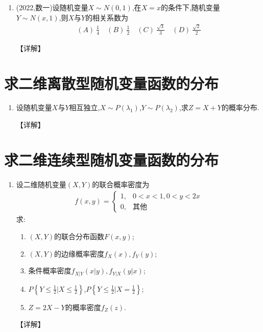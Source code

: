\documentclass[12pt, a4paper, oneside, UTF8]{ctexbook}
\begin{document}
\begin{enumerate}[label=\arabic*.,start=4]
    \item (2022,数一)设随机变量$X\sim N(0,1)$,在$X=x$的条件下,随机变量$Y\sim N(x,1)$,则$X$与$Y$的相关系数为
    \begin{align*}
        (A)\ \frac{1}{4} \quad (B)\ \frac{1}{2} \quad (C)\ \frac{\sqrt{3}}{3} \quad (D)\ \frac{\sqrt{2}}{2}
    \end{align*}
    
    \begin{solution}
    【详解】
    \end{solution}
\end{enumerate}

\section{求二维离散型随机变量函数的分布}

\begin{enumerate}[label=\arabic*.,start=12]
    \item 设随机变量$X$与$Y$相互独立,$X\sim P(\lambda_1)$,$Y\sim P(\lambda_2)$,求$Z=X+Y$的概率分布.
    
    \begin{solution}
    【详解】
    \end{solution}
\end{enumerate}

\section{求二维连续型随机变量函数的分布}

\begin{enumerate}[label=\arabic*.,start=13]
    \item 设二维随机变量$(X,Y)$的联合概率密度为
    \begin{align*}
        f(x,y)=\begin{cases}
            1, & 0<x<1,0<y<2x \\
            0, & \text{其他}
        \end{cases}
    \end{align*}
    求:
    \begin{enumerate}
        \item $(X,Y)$的联合分布函数$F(x,y)$;
        \item $(X,Y)$的边缘概率密度$f_X(x),f_Y(y)$;
        \item 条件概率密度$f_{X|Y}(x|y),f_{Y|X}(y|x)$;
        \item $P\left\{Y\leq \frac{1}{2}|X\leq \frac{1}{2}\right\}$,$P\left\{Y\leq \frac{1}{2}|X=\frac{1}{2}\right\}$;
        \item $Z=2X-Y$的概率密度$f_Z(z)$.
    \end{enumerate}
    
    \begin{solution}
    【详解】
    \end{solution}
\end{enumerate}
\end{document}
